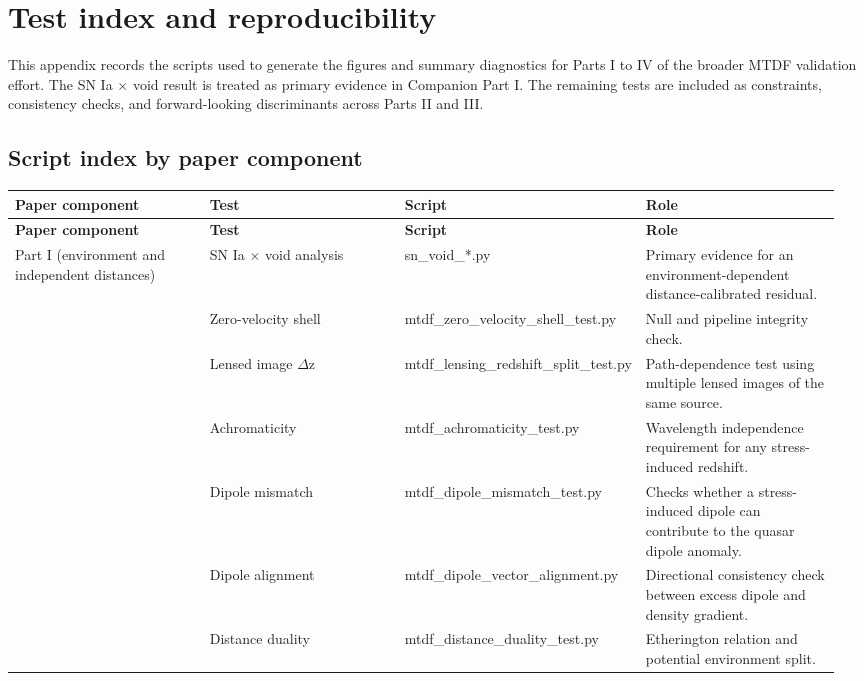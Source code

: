 \documentclass[11pt,a4paper]{article}
\begin{document}
\section{Test index and reproducibility}
\label{sec:appendix-a}
This appendix records the scripts used to generate the figures and summary diagnostics for Parts I to IV of the broader MTDF validation effort.
The SN Ia $\times$ void result is treated as primary evidence in Companion Part I. The remaining tests are included as constraints, consistency checks, and forward-looking discriminants across Parts II and III.

\subsection{Script index by paper component}
\begingroup\footnotesize
\begin{longtable}{>{\RaggedRight\arraybackslash}p{0.240\linewidth}>{\RaggedRight\arraybackslash}p{0.240\linewidth}>{\RaggedRight\arraybackslash}p{0.240\linewidth}>{\RaggedRight\arraybackslash}p{0.240\linewidth}}
\toprule
\textbf{Paper component} & \textbf{Test} & \textbf{Script} & \textbf{Role} \tabularnewline
\midrule\endfirsthead
\toprule
\textbf{Paper component} & \textbf{Test} & \textbf{Script} & \textbf{Role} \tabularnewline
\midrule\endhead
\bottomrule\endfoot
Part I (environment and independent distances) & SN Ia $\times$ void analysis & sn\_\allowbreak{}void\_\allowbreak{}*.py & Primary evidence for an environment-dependent distance-calibrated residual. \tabularnewline
\multirow{8}{*}{Part III (photon coupling $\kappa$) \emph{[speculative]}} & Zero-velocity shell & mtdf\_\allowbreak{}zero\_\allowbreak{}velocity\_\allowbreak{}shell\_\allowbreak{}test.py & Null and pipeline integrity check. \tabularnewline
 & Lensed image $\Delta$z & mtdf\_\allowbreak{}lensing\_\allowbreak{}redshift\_\allowbreak{}split\_\allowbreak{}test.py & Path-dependence test using multiple lensed images of the same source. \tabularnewline
 & Achromaticity & mtdf\_\allowbreak{}achromaticity\_\allowbreak{}test.py & Wavelength independence requirement for any stress-induced redshift. \tabularnewline
 & Dipole mismatch & mtdf\_\allowbreak{}dipole\_\allowbreak{}mismatch\_\allowbreak{}test.py & Checks whether a stress-induced dipole can contribute to the quasar dipole anomaly. \tabularnewline
 & Dipole alignment & mtdf\_\allowbreak{}dipole\_\allowbreak{}vector\_\allowbreak{}alignment.py & Directional consistency check between excess dipole and density gradient. \tabularnewline
 & Distance duality & mtdf\_\allowbreak{}distance\_\allowbreak{}duality\_\allowbreak{}test.py & Etherington relation and potential environment split. \tabularnewline

\end{longtable}
\end{document}
